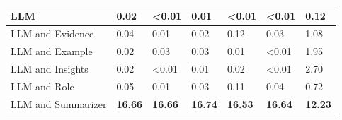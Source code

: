 \begin{tabular}{|l|l|l|l|l|l|l|}
 \hline
 LLM & 0.02 & \textless{}0.01 & 0.01 & \textless{}0.01 & \textless{}0.01 & 0.12 \\
 \hline
 LLM and Evidence & 0.04 & 0.01 & 0.02 & 0.12 & 0.03 & 1.08 \\
 \hline
 LLM and Example & 0.02 & 0.03 & 0.03 & 0.01 & \textless{}0.01 & 1.95 \\
 \hline
 LLM and Insights & 0.02 & \textless{}0.01 & 0.01 & 0.02 & \textless{}0.01 & 2.70 \\
 \hline
 LLM and Role & 0.05 & 0.01 & 0.03 & 0.11 & 0.04 & 0.72 \\
 \hline
 LLM and Summarizer & \textbf{16.66} & \textbf{16.66} & \textbf{16.74} & \textbf{16.53} & \textbf{16.64} & \textbf{12.23} \\
\hline
\end{tabular}
